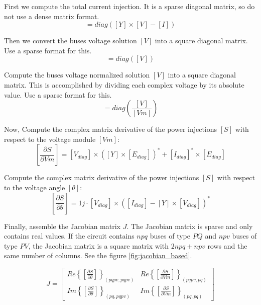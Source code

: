 \documentclass[nols,a4paper,twoside,notoc,fleqn]{tufte-book}
\begin{document}
First we compute the total current injection. It is a sparse diagonal matrix, so do not use a dense matrix format.
\begin{equation}
[I_{diag}] = diag([Y] \times [V] - [I])
\end{equation}

Then we convert the buses voltage solution $[V]$ into a square diagonal matrix. Use a sparse format for this.
\begin{equation}
[V_{diag}] = diag([V])
\end{equation}

Compute the buses voltage normalized solution $[V]$ into a square diagonal matrix. This is accomplished by dividing each complex voltage by its absolute value. Use a sparse format for this.
\begin{equation}
[E_{diag}] = diag\left(\frac{[V]}{[Vm]}\right)
\end{equation}


Now, Compute the complex matrix derivative of the power injections $[S]$ with respect to the voltage module $[Vm]$:
\begin{equation}
\left[\frac{\partial S}{\partial Vm}\right] = [V_{diag}] \times \left([Y] \times [E_{diag}] \right)^* + [I_{diag}]^* \times  [E_{diag}]
\end{equation}
    
Compute the complex matrix derivative of the power injections $[S]$ with respect to the voltage angle $[\theta]$:
\begin{equation}
\left[\frac{\partial S}{\partial \theta}\right] = 1j \cdot [V_{diag}] \times  \left([I_{diag}] - [Y] \times [V_{diag}] \right)^*
\end{equation}

Finally, assemble the Jacobian matrix $J$. The Jacobian matrix is sparse and only contains real values. If the circuit contains $npq$ buses of type $PQ$ and $npv$ buses of type $PV$, the Jacobian matrix is a square matrix with $2 npq + npv$ rows and the same number of columns. See the figure \ref{fig:jacobian_based}.


\begin{equation}
J=
\left[
\begin{array}{cc}
Re\left\{\left[\frac{\partial S}{\partial \theta}\right]\right\}_{(pqpv, pqpv)} &
Re\left\{\left[\frac{\partial S}{\partial Vm}\right]\right\}_{(pqpv, pq)} \\
Im\left\{\left[\frac{\partial S}{\partial \theta}\right]\right\}_{(pq, pqpv)} &
Im\left\{\left[\frac{\partial S}{\partial Vm}\right]\right\}_{(pq,pq)}
\end{array}
\right]
\end{equation}
\end{document}
